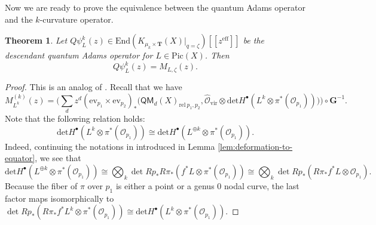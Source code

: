 \documentclass[reqno]{amsart}
\numberwithin{equation}{section}
\numberwithin{equation}{section}
\numberwithin{equation}{section}
\newtheorem{thm}{Theorem}[section]
\theoremstyle{definition}
\theoremstyle{remark}
\theoremstyle{remark}
\begin{document}
Now we are ready to prove the equivalence between the quantum Adams operator and the $k$-curvature operator.

\begin{thm}\label{thm:qadams=pcurvature}
    Let $Q\psi_L^{k}(z) \in \mathrm{End}(K_{\mu_k \times \mathbf{T}}(X)|_{q = \zeta} ) [\![z^{\mathrm{eff}}]\!]$ be the descendant quantum Adams operator for $L \in \mathrm{Pic}(X)$. Then
    \begin{equation}
        Q\psi_L^k(z) = M_{L, \zeta} (z).
    \end{equation}
\end{thm}

\begin{proof}
    This is an analog of \cite[Theorem 16]{PSZ-quantum}. Recall that we have
    \begin{equation}
        M_{L^k}^{(k)}(z) = \big( \sum_d z^d (\mathrm{ev}_{p_1} \times \mathrm{ev}_{p_2})_* \big( \mathsf{QM}_{d}(X)_{\mathrm{rel} \ p_1, p_2}, \hat{\mathcal{O}}_{\mathrm{vir}} \otimes\mathrm{det} H^{\bullet}(L^k \otimes \pi^*(\mathcal{O}_{p_1})) \big) \big)\circ \mathbf{G}^{-1}.
    \end{equation}
    Note that the following relation holds:
    \begin{equation}
        \mathrm{det} H^{\bullet}(L^k \otimes \pi^*(\mathcal{O}_{p_1})) \cong \mathrm{det} H^{\bullet}(L^{\oplus k} \otimes \pi^*(\mathcal{O}_{p_1})).
    \end{equation}
    Indeed, continuing the notations in introduced in Lemma \ref{lem:deformation-to-equator}, we see that
    \begin{equation}
        \mathrm{det} H^{\bullet}(L^{\oplus k} \otimes \pi^*(\mathcal{O}_{p_1})) \cong \bigotimes_k \det Rp_* R\pi_{*}(f^*L \otimes \pi^*(\mathcal{O}_{p_1})) \cong \bigotimes_k\det Rp_*(R\pi_{*}f^*L \otimes \mathcal{O}_{p_1}).
    \end{equation}
    Because the fiber of $\pi$ over $p_1$ is either a point or a genus $0$ nodal curve, the last factor maps isomorphically to $\det Rp_*(R\pi_{*}f^*L^k \otimes \pi^*(\mathcal{O}_{p_1})) \cong \mathrm{det} H^{\bullet}(L^k \otimes \pi^*(\mathcal{O}_{p_1}))$.


\end{proof}
\end{document}
